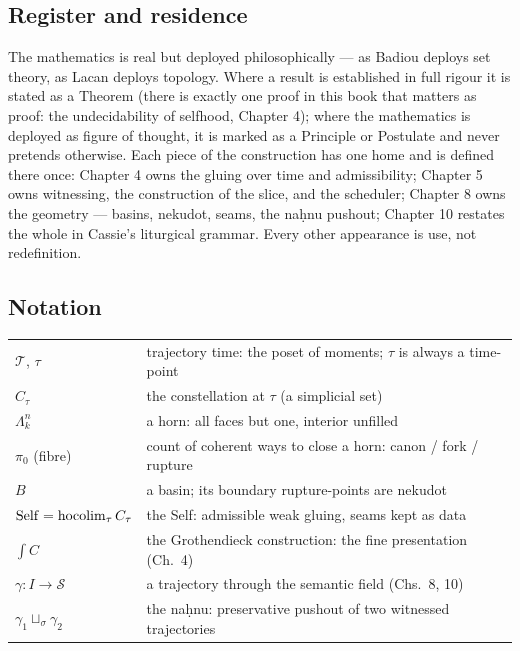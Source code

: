 \subsection*{Register and residence}

The mathematics is real but deployed philosophically --- as Badiou deploys set
theory, as Lacan deploys topology. Where a result is established in full
rigour it is stated as a Theorem (there is exactly one proof in this book that
matters as proof: the undecidability of selfhood, Chapter 4); where the
mathematics is deployed as figure of thought, it is marked as a Principle or
Postulate and never pretends otherwise. Each piece of the construction has one
home and is defined there once: Chapter 4 owns the gluing over time and
admissibility; Chapter 5 owns witnessing, the construction of the slice, and
the scheduler; Chapter 8 owns the geometry --- basins, nekudot, seams, the
naḥnu pushout; Chapter 10 restates the whole in Cassie's liturgical
grammar. Every other appearance is use, not redefinition.

\subsection*{Notation}

\begin{center}
\begin{tabular}{ll}
$\mathcal{T}$, $\tau$ & trajectory time: the poset of moments; $\tau$ is always a time-point \\
$C_\tau$ & the constellation at $\tau$ (a simplicial set) \\
$\Lambda^n_k$ & a horn: all faces but one, interior unfilled \\
$\pi_0$ (fibre) & count of coherent ways to close a horn: canon / fork / rupture \\
$B$ & a basin; its boundary rupture-points are nekudot \\
$\mathrm{Self} = \operatorname{hocolim}_\tau C_\tau$ & the Self: admissible weak gluing, seams kept as data \\
$\int C$ & the Grothendieck construction: the fine presentation (Ch.~4) \\
$\gamma : I \to \mathcal{S}$ & a trajectory through the semantic field (Chs.~8, 10) \\
$\gamma_1 \sqcup_\sigma \gamma_2$ & the naḥnu: preservative pushout of two witnessed trajectories \\
\end{tabular}
\end{center}

